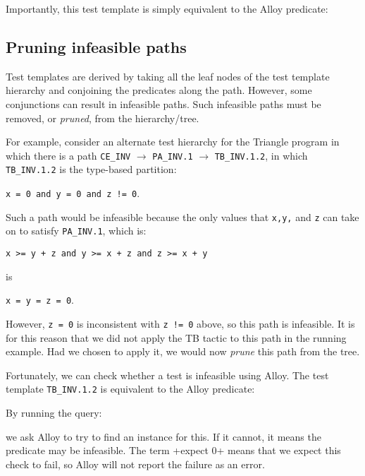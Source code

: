 Importantly, this test template is simply equivalent to the Alloy predicate:

\lstset{aboveskip=3mm}


\subsection{Pruning infeasible paths}

Test templates are derived by taking all the leaf nodes of the test template hierarchy and conjoining the predicates along the path. However, some conjunctions can result in infeasible paths. Such infeasible paths must be removed, or {\em pruned}, from the hierarchy/tree.


For example, consider an alternate test hierarchy for the Triangle program in which there is a path \texttt{CE\_INV} $\rightarrow$ \texttt{PA\_INV.1} $\rightarrow$ \texttt{TB\_INV.1.2}, in which \texttt{TB\_INV.1.2} is the type-based partition:

\quad \verb|x = 0 and y = 0 and z != 0|.

Such a path would be infeasible because the only values that \verb+x,y,+ and \texttt{z} can take on to satisfy \texttt{PA\_INV.1}, which is:

\quad \verb|x >= y + z and y >= x + z and z >= x + y|

 is 

\quad \verb|x = y = z = 0|.

However, \verb|z = 0| is inconsistent with \verb|z != 0| above, so this path is infeasible. It is for this reason that we did not apply the TB tactic to this path in the running example. Had we chosen to apply it, we would now \emph{prune} this path from the tree.

Fortunately, we can check whether a test is infeasible using Alloy. The test template  \texttt{TB\_INV.1.2} is equivalent to the Alloy predicate:

\lstset{aboveskip=3mm}

By running the query:

\lstset{aboveskip=3mm}

we ask Alloy to try to find an instance for this. If it cannot, it means the predicate may be infeasible. The term \A+expect 0+ means that we expect this check to fail, so Alloy will not report the failure as an error.


